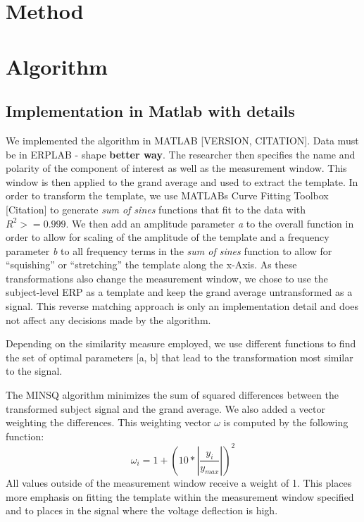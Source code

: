 \documentclass[
  man,floatsintext]{apa7}
\begin{document}
\hypertarget{method}{%
\section{Method}\label{method}}

\hypertarget{algorithm}{%
\section{Algorithm}\label{algorithm}}

\hypertarget{implementation-in-matlab-with-details}{%
\subsection{Implementation in Matlab with details}\label{implementation-in-matlab-with-details}}

We implemented the algorithm in MATLAB {[}VERSION, CITATION{]}. Data must be in ERPLAB - shape \textbf{better way}. The researcher then specifies the name and polarity of the component of interest as well as the measurement window. This window is then applied to the grand average and used to extract the template. In order to transform the template, we use MATLABs Curve Fitting Toolbox {[}Citation{]} to generate \emph{sum of sines} functions that fit to the data with \(R^2 >= 0.999\). We then add an amplitude parameter \emph{a} to the overall function in order to allow for scaling of the amplitude of the template and a frequency parameter \emph{b} to all frequency terms in the \emph{sum of sines} function to allow for ``squishing'' or ``stretching'' the template along the x-Axis. As these transformations also change the measurement window, we chose to use the subject-level ERP as a template and keep the grand average untransformed as a signal. This reverse matching approach is only an implementation detail and does not affect any decisions made by the algorithm.

Depending on the similarity measure employed, we use different functions to find the set of optimal parameters {[}a, b{]} that lead to the transformation most similar to the signal.

The MINSQ algorithm minimizes the sum of squared differences between the transformed subject signal and the grand average. We also added a vector weighting the differences. This weighting vector \(\omega\) is computed by the following function:
\[\omega_i = 1+(10 * |\frac{y_i}{y_{max}}|)^2\]All values outside of the measurement window receive a weight of 1. This places more emphasis on fitting the template within the measurement window specified and to places in the signal where the voltage deflection is high.
\end{document}
